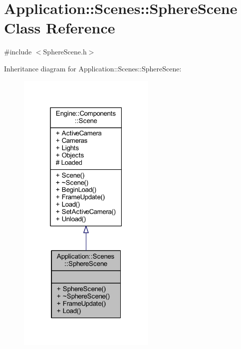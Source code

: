\hypertarget{classApplication_1_1Scenes_1_1SphereScene}{}\section{Application\+:\+:Scenes\+:\+:Sphere\+Scene Class Reference}
\label{classApplication_1_1Scenes_1_1SphereScene}


{\ttfamily \#include $<$Sphere\+Scene.\+h$>$}



Inheritance diagram for Application\+:\+:Scenes\+:\+:Sphere\+Scene\+:
\nopagebreak
\begin{figure}[H]
\begin{center}
\leavevmode
\includegraphics[width=187pt]{classApplication_1_1Scenes_1_1SphereScene__inherit__graph}
\end{center}
\end{figure}


